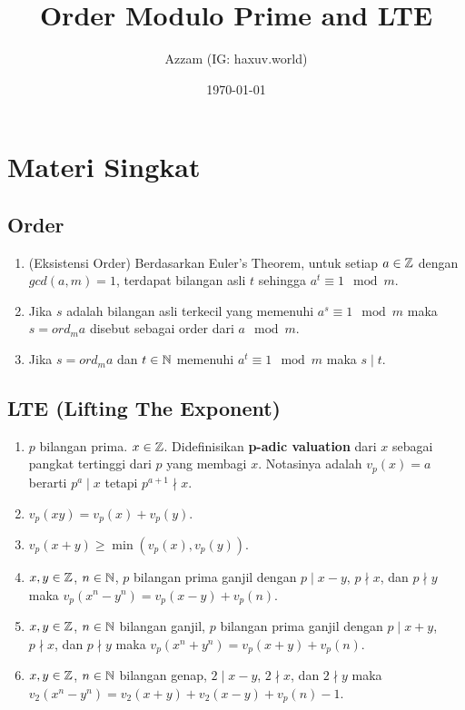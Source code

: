 \documentclass[12pt]{scrartcl}
\title{Order Modulo Prime and LTE}
\author{Azzam (IG: haxuv.world)}
\date{\today}
\begin{document}
\maketitle

\renewcommand*\contentsname{Daftar Isi}
\tableofcontents

\newpage

\section{Materi Singkat}
\subsection{Order}
\begin{enumerate}
    \item (Eksistensi Order) Berdasarkan Euler's Theorem, untuk setiap $a \in \mathbb Z$ dengan $gcd(a,m)=1$, terdapat bilangan asli $t$ sehingga $a^t \equiv 1 \mod m$.
    \item Jika $s$ adalah bilangan asli terkecil yang memenuhi $a^s \equiv 1 \mod m$ maka $s = ord_m a$ disebut sebagai order dari $a \mod m$.
    \item Jika $s = ord_m a$ dan $t \in \mathbb N$ memenuhi $a^t \equiv 1 \mod m$ maka $s \mid t$.
\end{enumerate}

\subsection{LTE (Lifting The Exponent)}
\begin{enumerate}
    \item $p$ bilangan prima. $x \in \mathbb Z$. Didefinisikan \textbf{p-adic valuation} dari $x$ sebagai pangkat tertinggi dari $p$ yang membagi $x$. Notasinya adalah $v_p(x)=a$ berarti $p^a \mid x$ tetapi $p^{a+1} \nmid x$.
    \item $v_p(xy) = v_p(x) + v_p(y)$.
    \item $v_p(x+y) \ge \min(v_p(x),v_p(y))$.
    \item [Lemma 1] $x,y \in \mathbb Z$, $n \in \mathbb N$, $p$ bilangan prima ganjil dengan $p \mid x-y$, $p \nmid x$, dan $p \nmid y$ maka $v_p(x^n-y^n)=v_p(x-y)+v_p(n)$.
    \item [Lemma 2] $x,y \in \mathbb Z$, $n \in \mathbb N$ bilangan ganjil, $p$ bilangan prima ganjil dengan $p \mid x+y$, $p \nmid x$, dan $p \nmid y$ maka $v_p(x^n+y^n)=v_p(x+y)+v_p(n)$.
    \item [Lemma 3] $x,y \in \mathbb Z$, $n \in \mathbb N$ bilangan genap,  $2 \mid x-y$, $2 \nmid x$, dan $2 \nmid y$ maka $v_2(x^n-y^n)=v_2(x+y)+v_2(x-y)+v_p(n)-1$.
    
\end{enumerate}
\end{document}
